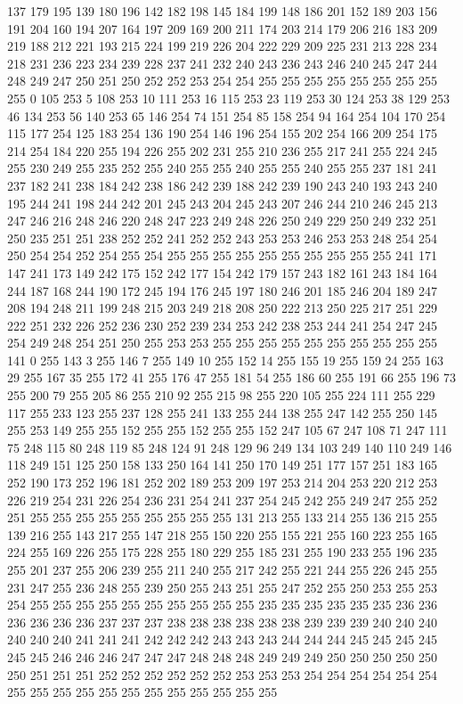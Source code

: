 137 179 195 139 180 196 142 182 198 145 184 199 148 186 201 152 189 203 156 191 204 160 194 207 164 197 209 169 200 211 174 203 214 179 206 216 183 209 219 188 212 221 193 215 224 199 219 226 204 222 229 209 225 231 213 228 234 218 231 236 223 234 239 228 237 241 232 240 243 236 243 246 240 245 247 244 248 249 247 250 251 250 252 252 253 254 254 255 255 255 255 255 255 255 255 255 0 105 253 5 108 253 10 111 253 16 115 253 23 119 253 30 124 253 38 129 253 46 134 253 56 140 253 65 146 254 74 151 254 85 158 254 94 164 254 104 170 254 115 177 254 125 183 254 136 190 254 146 196 254 155 202 254 166 209 254 175 214 254 184 220 255 194 226 255 202 231 255 210 236 255 217 241 255 224 245 255 230 249 255 235 252 255 240 255 255 240 255 255 240 255 255 237 181 241 237 182 241 238 184 242 238 186 242 239 188 242 239 190 243 240 193 243 240 195 244 241 198 244 242 201 245 243 204 245 243 207 246 244 210 246 245 213 247 246 216 248 246 220 248 247 223 249 248 226 250 249 229 250 249 232 251 250 235 251 251 
238 252 252 241 252 252 243 253 253 246 253 253 248 254 254 250 254 254 252 254 255 254 255 255 255 255 255 255 255 255 255 255 241 171 147 241 173 149 242 175 152 242 177 154 242 179 157 243 182 161 243 184 164 244 187 168 244 190 172 245 194 176 245 197 180 246 201 185 246 204 189 247 208 194 248 211 199 248 215 203 249 218 208 250 222 213 250 225 217 251 229 222 251 232 226 252 236 230 252 239 234 253 242 238 253 244 241 254 247 245 254 249 248 254 251 250 255 253 253 255 255 255 255 255 255 255 255 255 255 141 0 255 143 3 255 146 7 255 149 10 255 152 14 255 155 19 255 159 24 255 163 29 255 167 35 255 172 41 255 176 47 255 181 54 255 186 60 255 191 66 255 196 73 255 200 79 255 205 86 255 210 92 255 215 98 255 220 105 255 224 111 255 229 117 255 233 123 255 237 128 255 241 133 255 244 138 255 247 142 255 250 145 255 253 149 255 255 152 255 255 152 255 255 152 247 105 67 247 108 71 247 111 75 248 115 80 248 119 85 248 124 91 248 129 96 249 134 103 249 140 110 249 146 118 249 151 
125 250 158 133 250 164 141 250 170 149 251 177 157 251 183 165 252 190 173 252 196 181 252 202 189 253 209 197 253 214 204 253 220 212 253 226 219 254 231 226 254 236 231 254 241 237 254 245 242 255 249 247 255 252 251 255 255 255 255 255 255 255 255 255 131 213 255 133 214 255 136 215 255 139 216 255 143 217 255 147 218 255 150 220 255 155 221 255 160 223 255 165 224 255 169 226 255 175 228 255 180 229 255 185 231 255 190 233 255 196 235 255 201 237 255 206 239 255 211 240 255 217 242 255 221 244 255 226 245 255 231 247 255 236 248 255 239 250 255 243 251 255 247 252 255 250 253 255 253 254 255 255 255 255 255 255 255 255 255 255 235 235 235 235 235 235 236 236 236 236 236 236 237 237 237 238 238 238 238 238 238 239 239 239 240 240 240 240 240 240 241 241 241 242 242 242 243 243 243 244 244 244 245 245 245 245 245 245 246 246 246 247 247 247 248 248 248 249 249 249 250 250 250 250 250 250 251 251 251 252 252 252 252 252 252 253 253 253 254 254 254 254 254 254 255 255 255 255 255 255 255 255 255 255 255 255 
